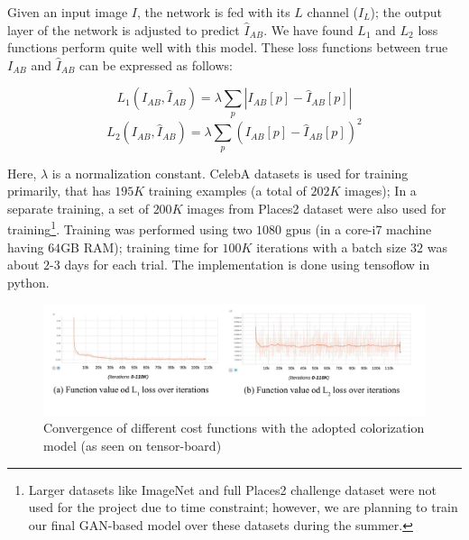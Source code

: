 \documentclass[10pt]{article}
\begin{document}
Given an input image $I$, the network is fed with its $L$ channel ($I_L$); the output layer of the network is adjusted to predict $\hat{I}_{AB}$. We have found $L_1$ and $L_2$ loss functions perform quite well with this model. These loss functions between true $I_{AB}$ and $\hat{I}_{AB}$ can be expressed as follows:

\[ L_1 (I_{AB}, \hat{I}_{AB}) = \lambda \sum_p | I_{AB}[p] - \hat{I}_{AB}[p] | \]  
\[ L_2 (I_{AB}, \hat{I}_{AB}) = \lambda \sum_p ( I_{AB}[p] - \hat{I}_{AB}[p] )^2 \]  

Here, $\lambda$ is a normalization constant. CelebA datasets \cite{celebA} is used for training primarily, that has $195K$ training examples (a total of  $202K$ images); 
In a separate training, a set of $200K$ images from Places2 dataset \cite{places2} were also used for training\footnote{Larger datasets like ImageNet \cite{deng2009imagenet} and full Places2 challenge dataset were not used for the project due to time constraint; however, we are planning to train our final GAN-based model over these datasets during the summer.}. Training was performed using two $1080$ gpus (in a core-i7 machine having $64$GB RAM); training time for $100K$ iterations with a batch size $32$ was about $2$-$3$ days for each trial. The implementation is done using tensoflow \cite{abadi2016tensorflow} in python.    


\begin{figure}[h]
\centering
\includegraphics[width=\linewidth]{Figs/8.pdf}
\vspace{-13mm}
\caption{Convergence of different cost functions with the adopted colorization model (as seen on tensor-board)}
\label{fig:loss}
\end{figure}  
\end{document}
